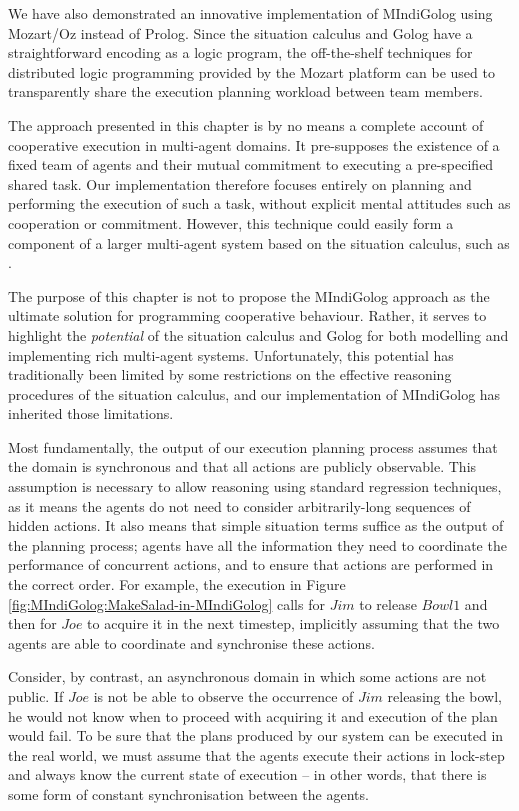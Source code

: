 We have also demonstrated an innovative implementation of MIndiGolog
using Mozart/Oz instead of Prolog. Since the situation calculus and
Golog have a straightforward encoding as a logic program, the off-the-shelf
techniques for distributed logic programming provided by the Mozart
platform can be used to transparently share the execution planning
workload between team members.

The approach presented in this chapter is by no means a complete account
of cooperative execution in multi-agent domains. It pre-supposes the
existence of a fixed team of agents and their mutual commitment to
executing a pre-specified shared task. Our implementation therefore
focuses entirely on planning and performing the execution of such
a task, without explicit mental attitudes such as cooperation or commitment.
However, this technique could easily form a component of a larger
multi-agent system based on the situation calculus, such as \citep{shapiro02casl,lesperance05ecasl}.

The purpose of this chapter is not to propose the MIndiGolog approach
as the ultimate solution for programming cooperative behaviour. Rather,
it serves to highlight the \emph{potential} of the situation calculus
and Golog for both modelling and implementing rich multi-agent systems.
Unfortunately, this potential has traditionally been limited by some
restrictions on the effective reasoning procedures of the situation
calculus, and our implementation of MIndiGolog has inherited those
limitations.

Most fundamentally, the output of our execution planning process assumes
that the domain is synchronous and that all actions are publicly observable.
This assumption is necessary to allow reasoning using standard regression
techniques, as it means the agents do not need to consider arbitrarily-long
sequences of hidden actions. It also means that simple situation terms
suffice as the output of the planning process; agents have all the
information they need to coordinate the performance of concurrent
actions, and to ensure that actions are performed in the correct order.
For example, the execution in Figure \ref{fig:MIndiGolog:MakeSalad-in-MIndiGolog}
calls for $Jim$ to release $Bowl1$ and then for $Joe$ to acquire
it in the next timestep, implicitly assuming that the two agents are
able to coordinate and synchronise these actions.

Consider, by contrast, an asynchronous domain in which some actions
are not public. If $Joe$ is not be able to observe the occurrence
of $Jim$ releasing the bowl, he would not know when to proceed with
acquiring it and execution of the plan would fail. To be sure that
the plans produced by our system can be executed in the real world,
we must assume that the agents execute their actions in lock-step
and always know the current state of execution -- in other words,
that there is some form of constant synchronisation between the agents.

